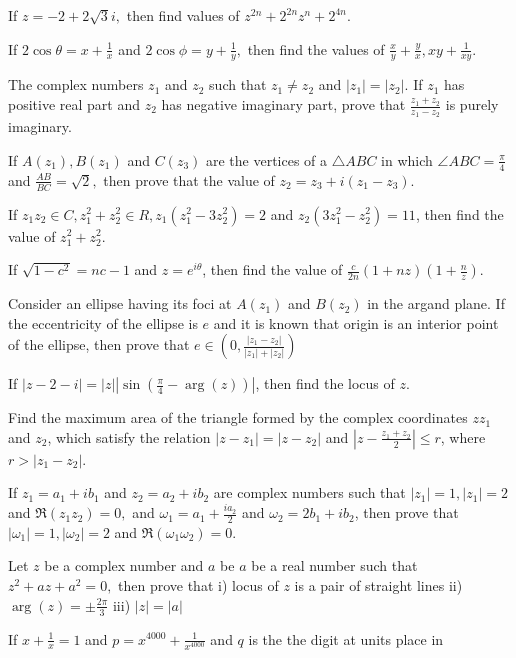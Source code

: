 \item If $z = -2 + 2\sqrt{3}i,$ then find values of $z^{2n} + 2^{2n}z^n + 2^{4n}$.
\item If $2\cos\theta = x + \frac{1}{x}$ and $2\cos\phi = y + \frac{1}{y},$ then find the values of $\frac{x}{y} +
  \frac{y}{x}, xy + \frac{1}{xy}$.
\item The complex numbers $z_1$ and $z_2$ such that $z_1\neq z_2$ and $|z_1| = |z_2|$. If $z_1$ has positive real part
  and $z_2$ has negative imaginary part, prove that $\frac{z_1 + z_2}{z_1 - z_2}$ is purely imaginary.
\item If $A(z_1), B(z_1)$ and $C(z_3)$ are the vertices of a $\triangle ABC$ in which $\angle ABC = \frac{\pi}{4}$ and
  $\frac{AB}{BC} = \sqrt{2},$ then prove that the value of $z_2 = z_3 + i(z_1 - z_3)$.
\item If $z_1z_2\in C, z_1^2 + z_2^2 \in R, z_1(z_1^2 - 3z_2^2) = 2$ and $z_2(3z_1^2 - z_2^2) = 11$, then find the value
  of $z_1^2 + z_2^2$.
\item If $\sqrt{1 - c^2} = nc - 1$ and $z = e^{i\theta}$, then find the value of $\frac{c}{2n}(1 + nz)\left(1 +
  \frac{n}{z}\right)$.
\item Consider an ellipse having its foci at $A(z_1)$ and $B(z_2)$ in the argand plane. If the eccentricity of the
  ellipse is $e$ and it is known that origin is an interior point of the ellipse, then prove that $e\in \left(0, \frac{|z_1 -
    z_2|}{|z_1| + |z_2|}\right)$
\item If $|z - 2 -i| = |z|\left|\sin\left(\frac{\pi}{4} - \arg(z)\right)\right|$, then find the locus of $z$.
\item Find the maximum area of the triangle formed by the complex coordinates $z z_1$ and $z_2$, which satisfy the
  relation $|z - z_1| = |z - z_2|$ and $\left|z - \frac{z_1 + z_2}{2}\right|\leq r$, where $r > |z_1 - z_2|$.
\item If $z_1 = a_1 + ib_1$ and $z_2 = a_2 + ib_2$ are complex numbers such that $|z_1| = 1, |z_1| = 2$ and $\Re(z_1z_2) =
  0,$ and $\omega_1 = a_1 + \frac{ia_2}{2}$ and $\omega_2 = 2b_1 + ib_2$, then prove that $|\omega_1| = 1, |\omega_2| = 2$ and
  $\Re(\omega_1\omega_2) = 0$.
\item Let $z$ be a complex number and $a$ be $a$ be a real number such that $z^2 + az + a^2 = 0,$ then prove that i)
  locus of $z$ is a pair of straight lines ii) $\arg(z) = \pm\frac{2\pi}{3}$ iii) $|z| = |a|$
\item If $x + \frac{1}{x} = 1$ and $p = x^{4000} + \frac{1}{x^{4000}}$ and $q$ is the the digit at units place in

